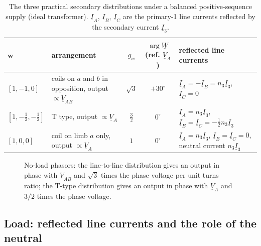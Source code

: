 \documentclass[10pt,a4paper]{scrartcl}
\newcommand{\ph}[1]{\underline{#1}}
\newcommand{\vect}[1]{\boldsymbol{#1}}
\begin{document}
\begin{onehalfspace}
\begin{table}[htbp]
\centering
\caption{The three practical secondary distributions under a balanced positive-sequence supply (ideal transformer). $\ph{I}_A$, $\ph{I}_B$, $\ph{I}_C$ are the primary-1 line currents reflected by the secondary current $\ph{I}_3$.}
\label{tab:distr}
\footnotesize
\begin{tabular}{l p{4.6cm} c c p{5.6cm}}
\toprule
$\vect{w}$ & arrangement & $g_w$ & $\arg\ph{W}$ (ref. $\ph{V}_A$) & reflected line currents \\
\midrule
$[1,-1,0]$ & coils on $a$ and $b$ in opposition, output $\propto \ph{V}_{AB}$ & $\sqrt3$ & $+30^\circ$ & $\ph{I}_A = -\ph{I}_B = n_3\ph{I}_3$, $\ph{I}_C = 0$ \\
$[1,-\tfrac12,-\tfrac12]$ & T type, output $\propto \ph{V}_A$ & $\tfrac32$ & $0^\circ$ & $\ph{I}_A = n_3\ph{I}_3$, $\ph{I}_B = \ph{I}_C = -\tfrac12 n_3\ph{I}_3$ \\
$[1,0,0]$ & coil on limb $a$ only, output $\propto \ph{V}_A$ & $1$ & $0^\circ$ & $\ph{I}_A = n_3\ph{I}_3$, $\ph{I}_B = \ph{I}_C = 0$, neutral current $n_3\ph{I}_3$ \\
\bottomrule
\end{tabular}
\end{table}

\begin{figure}[htbp]
\centering
{}
\caption{No-load phasors: the line-to-line distribution gives an output in phase with $\ph{V}_{AB}$ and $\sqrt3$ times the phase voltage per unit turns ratio; the T-type distribution gives an output in phase with $\ph{V}_A$ and $3/2$ times the phase voltage.}
\label{fig:phasor}
\end{figure}

\subsection{Load: reflected line currents and the role of the neutral}


\end{onehalfspace}
\end{document}

